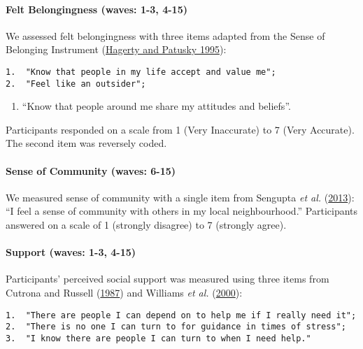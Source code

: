 \documentclass[
  singlecolumn,
  9pt]{article}
\let\oldparagraph\paragraph
\renewcommand{\paragraph}[1]{\oldparagraph{#1}\mbox{}}
\providecommand{\tightlist}{%
  \setlength{\itemsep}{0pt}\setlength{\parskip}{0pt}}\usepackage{longtable,booktabs,array}
\begin{document}
\paragraph{Felt Belongingness (waves: 1-3,
4-15)}\label{felt-belongingness-waves-1-3-4-15}

We assessed felt belongingness with three items adapted from the Sense
of Belonging Instrument (\hyperref[ref-hagerty1995]{Hagerty and Patusky
1995}):

\begin{verbatim}
1.  "Know that people in my life accept and value me";
2.  "Feel like an outsider";
\end{verbatim}

\begin{enumerate}
\def\labelenumi{\arabic{enumi}.}
\setcounter{enumi}{2}
\tightlist
\item
  ``Know that people around me share my attitudes and beliefs''.
\end{enumerate}

Participants responded on a scale from 1 (Very Inaccurate) to 7 (Very
Accurate). The second item was reversely coded.

\paragraph{Sense of Community (waves:
6-15)}\label{sense-of-community-waves-6-15}

We measured sense of community with a single item from Sengupta \emph{et
al.} (\hyperref[ref-sengupta2013]{2013}): ``I feel a sense of community
with others in my local neighbourhood.'' Participants answered on a
scale of 1 (strongly disagree) to 7 (strongly agree).

\paragraph{Support (waves: 1-3, 4-15)}\label{support-waves-1-3-4-15}

Participants' perceived social support was measured using three items
from Cutrona and Russell (\hyperref[ref-cutrona1987]{1987}) and Williams
\emph{et al.} (\hyperref[ref-williams_cyberostracism_2000]{2000}):

\begin{verbatim}
1.  "There are people I can depend on to help me if I really need it";
2.  "There is no one I can turn to for guidance in times of stress";
3.  "I know there are people I can turn to when I need help." 
\end{verbatim}
\end{document}
